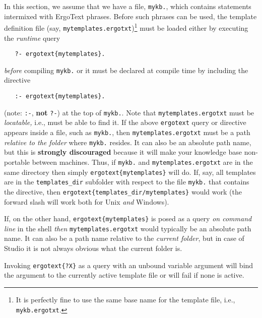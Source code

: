 In this section, we assume that we have a file, \texttt{mykb.\flrext},
which contains \FLSYSTEM statements intermixed with ErgoText phrases.
Before such phrases can be used, the template definition file (say,
\texttt{mytemplates.ergotxt})\footnote{
  It is perfectly fine to use the same base name for the template file,
  i.e., \texttt{mykb.ergotxt}.
}
must be loaded either by executing the \emph{runtime}  query
\begin{verbatim}
   ?- ergotext{mytemplates}.
\end{verbatim}
\emph{before} compiling \texttt{mykb.\flrext} or it must be declared
at compile time by including the directive
\begin{verbatim}
   :- ergotext{mytemplates}.
\end{verbatim}
(note: \texttt{:-}, \textbf{not} \texttt{?-}) at the top of
\texttt{mykb.\flrext}.  Note that \texttt{mytemplates.ergotxt} must be
\emph{locatable,} i.e., \ERGO must be able to find it. If the above
\texttt{ergotext} query or directive appears inside a file, such as 
\texttt{mykb.\flrext}, then
\texttt{mytemplates.ergotxt} must be a path \emph{relative to the folder}
where \texttt{mykb.\flrext} resides. It can also be an absolute path name,
but this is \textbf{strongly discouraged} because it will make your knowledge
base non-portable between machines. 
Thus, if
\texttt{mykb.\flrext} and \texttt{mytemplates.ergotxt} are in the same
directory then simply \texttt{ergotext\{mytemplates\}} will do. If, say, all
templates are in the \texttt{templates\_dir} subfolder with respect to
the file \texttt{mykb.\flrext} that contains the directive,
then \texttt{ergotext\{templates\_dir/mytemplates\}}  would
work (the forward slash will work both for Unix \emph{and} Windows). 

If, on the other hand,
\texttt{ergotext\{mytemplates\}} is posed as a query \emph{on command line}
in the \ERGO shell \emph{then} \texttt{mytemplates.ergotxt} would typically
be an absolute path name. It can also be a path name relative to the
\emph{current folder}, but in case of \ERGOAI Studio it is not always obvious
what the current folder is.

Invoking \texttt{ergotext\{?X\}} as a query with an unbound variable
argument will bind the argument to the currently active template file or will
fail if none is active.

